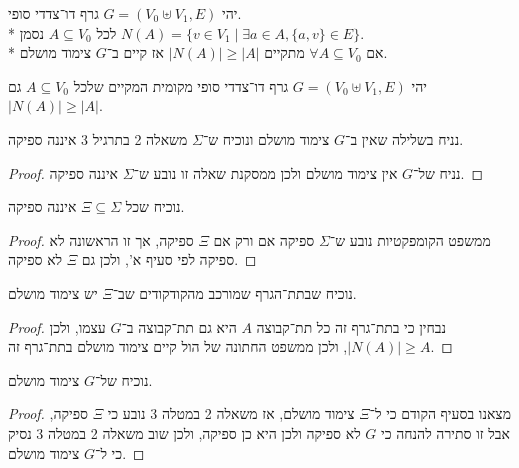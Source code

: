 \Question{}
\begin{theorem}
	יהי $G = (V_0 \uplus V_1, E)$ גרף דו־צדדי סופי. \\*
	לכל $A \subseteq V_0$ נסמן $N(A) = \{ v \in V_1 \mid \exists a \in A, \{a, v\} \in E \}$. \\*
	אם $\forall A \subseteq V_0$ מתקיים $|N(A)| \ge |A|$ אז קיים ב־$G$ צימוד מושלם.
\end{theorem}
יהי $G = (V_0 \uplus V_1, E)$ גרף דו־צדדי סופי מקומית המקיים שלכל $A \subseteq V_0$ גם $|N(A)| \ge |A|$.

\Subquestion{}
נניח בשלילה שאין ב־$G$ צימוד מושלם ונוכיח ש־$\Sigma$ משאלה 2 בתרגיל 3 איננה ספיקה.
\begin{proof}
	נניח של־$G$ אין צימוד מושלם ולכן ממסקנת שאלה זו נובע ש־$\Sigma$ איננה ספיקה.
\end{proof}

\Subquestion{}
נוכיח שכל $\Xi \subseteq \Sigma$ איננה ספיקה.
\begin{proof}
	ממשפט הקומפקטיות נובע ש־$\Sigma$ ספיקה אם ורק אם $\Xi$ ספיקה, אך זו הראשונה לא ספיקה לפי סעיף א', ולכן גם $\Xi$ לא ספיקה.
\end{proof}

\Subquestion{}
נוכיח שבתת־הגרף שמורכב מהקודקודים שב־$\Xi$ יש צימוד מושלם.
\begin{proof}
	נבחין כי בתת־גרף זה כל תת־קבוצה $A$ היא גם תת־קבוצה ב־$G$ עצמו, ולכן $|N(A)| \ge A$, ולכן ממשפט החתונה של הול קיים צימוד מושלם בתת־גרף זה.
\end{proof}

\Subquestion{}
נוכיח של־$G$ צימוד מושלם.
\begin{proof}
	מצאנו בסעיף הקודם כי ל־$\Xi$ צימוד מושלם, אז משאלה 2 במטלה 3 נובע כי $\Xi$ ספיקה, אבל זו סתירה להנחה כי $G$ לא ספיקה ולכן היא כן ספיקה, ולכן שוב משאלה 2 במטלה 3 נסיק כי ל־$G$ צימוד מושלם.
\end{proof}


